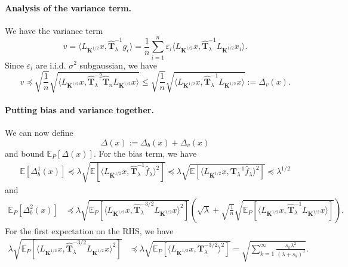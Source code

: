 \documentclass[11pt,a4paper]{article}
\renewcommand{\hat}{\widehat}
\theoremstyle{definition}
\theoremstyle{plain}
\theoremstyle{remark}
\begin{document}
\paragraph{Analysis of the variance term.}
We have the variance term
\[v=\langle L_{\boldsymbol K^{1/2}}x,\hat{\boldsymbol T}_{\lambda}^{-1}g_\epsilon\rangle=\frac{1}{n}\sum_{i=1}^n \varepsilon_i\langle L_{\boldsymbol K^{1/2}}x,\hat{\boldsymbol T}_{\lambda}^{-1}L_{\boldsymbol K^{1/2}}x_i\rangle.\]
Since $\varepsilon_i$ are i.i.d. $\sigma^2$ subgaussian, we have
\[v\preceq\sqrt{\frac{1}{n}}\sqrt{{\langle L_{\boldsymbol{K}^{1/2}}x,\hat{\boldsymbol T}_\lambda^{-2}\hat{\boldsymbol T}_n L_{\boldsymbol K^{1/2}}x\rangle}}\leq \sqrt{\frac{1}{n}}\sqrt{{\langle L_{\boldsymbol{K}^{1/2}}x,\hat{\boldsymbol T}_\lambda^{-1} L_{\boldsymbol K^{1/2}}x\rangle}}:=\Delta_v(x).\]
\paragraph{Putting bias and variance together.} 
We can now define \[\Delta(x):=\Delta_b(x)+\Delta_v(x)\]
and bound  $\mathbb E_P[\Delta(x)].$ For the bias term, we have
\begin{align*}
\mathbb{E}\left[\Delta_b^1(x)\right]\preceq\lambda\sqrt{\mathbb{E}\left[	\langle L_{\boldsymbol K^{1/2}}x,  \hat{\boldsymbol{T}}_\lambda^{-1}\hat{f}_\lambda\rangle ^2\right]}\preceq\lambda\sqrt{\mathbb{E}\left[	\langle L_{\boldsymbol K^{1/2}}x,  {\boldsymbol{T}}_\lambda^{-1}\hat{f}_\lambda\rangle ^2\right]}\preceq \lambda^{1/2}
\end{align*}
and
\begin{align*}
	\mathbb E_P\left[\Delta_b^2(x)\right]&\preceq \lambda \sqrt{\mathbb{E}_P\left[\langle L_{\boldsymbol K^{1/2}}x,\hat{\boldsymbol{T}}_{\lambda}^{-3/2} L_{\boldsymbol K^{1/2}} x\rangle^2\right]}\left(\sqrt{\lambda}+\sqrt{\frac{1}{n}}\sqrt{\mathbb{E}_P\left[{\langle L_{\boldsymbol{K}^{1/2}}x,\hat{\boldsymbol T}_\lambda^{-1} L_{\boldsymbol K^{1/2}}x\rangle}\right]}\right).
\end{align*}
For the first expectation on the RHS, we have
\begin{align}
\lambda	\sqrt{\mathbb{E}_P\left[\langle L_{\boldsymbol K^{1/2}}x,\hat{\boldsymbol{T}}_{\lambda}^{-3/2} L_{\boldsymbol K^{1/2}} x\rangle^2\right]}& \preceq\lambda \sqrt{\mathbb{E}_P\left[\langle L_{\boldsymbol K^{1/2}}x,{\boldsymbol{T}}_{\lambda}^{-3/2}\rangle^2\right]}=\sqrt{\sum_{k=1}^{\infty}\frac{s_k\lambda^2}{(\lambda+s_k)^3}}.\nonumber
\end{align}
\end{document}
